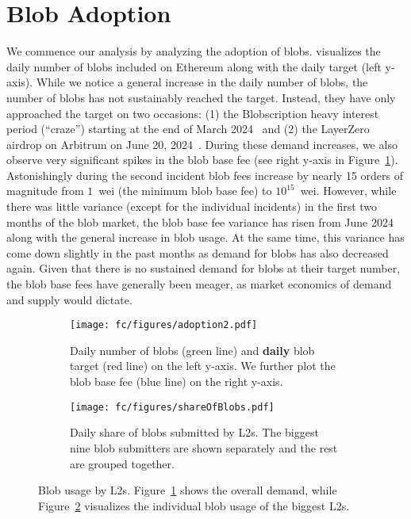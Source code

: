 \section{Blob Adoption}
We commence our analysis by analyzing the adoption of blobs.  visualizes the daily number of blobs included on Ethereum along with the daily target (left y-axis). While we notice a general increase in the daily number of blobs, the number of blobs has not sustainably reached the target. Instead, they have only approached the target on two occasions: (1) the Blobscription heavy interest period (``craze'') starting at the end of March 2024~\parencite{nijkerk2024ethereum} and (2) the LayerZero airdrop on Arbitrum on June 20, 2024~\parencite{stevens2024arbitrum}. During these demand increases, we also observe very significant spikes in the blob base fee (see right y-axis in Figure~\ref{fig:adoption2}). Astonishingly during the second incident blob fees increase by nearly 15 orders of magnitude from $1$~wei (the minimum blob base fee) to $10^{15}$~wei. However, while there was little variance (except for the individual incidents) in the first two months of the blob market, the blob base fee variance has risen from June 2024 along with the general increase in blob usage. At the same time, this variance has come down slightly in the past months as demand for blobs has also decreased again. Given that there is no sustained demand for blobs at their target number, the blob base fees have generally been meager, as market economics of demand and supply would dictate.

\begin{figure}[t!]\vspace{-6pt}
    \centering
    \begin{subfigure}[t]{0.48\columnwidth}
    \centering
        \texttt{[image: fc/figures/adoption2.pdf]}
    \caption{Daily number of blobs (green line) and \textbf{daily} blob target (red line) on the left y-axis. We further plot the blob base fee (blue line) on the right y-axis.}
    \label{fig:adoption2}
    \end{subfigure}
    \hfill
    \begin{subfigure}[t]{0.49\columnwidth}
    \centering
        \texttt{[image: fc/figures/shareOfBlobs.pdf]}
    \caption{Daily share of blobs submitted by L2s. The biggest nine blob submitters are shown separately and the rest are grouped together. }
    \label{fig:shareOfBlobs}
    \end{subfigure}    \vspace{-6pt}
    \caption{Blob usage by L2s. Figure~\ref{fig:adoption2} shows the overall demand, while Figure~\ref{fig:shareOfBlobs} visualizes the individual blob usage of the biggest L2s.}\label{fig:adoption}
\end{figure}

